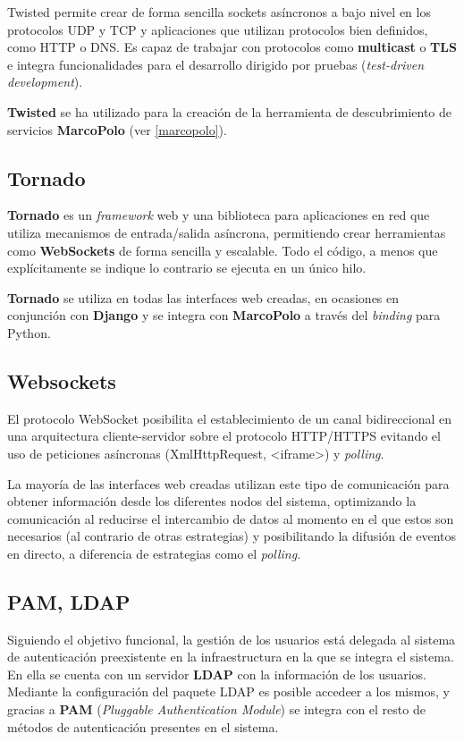 Twisted permite crear de forma sencilla sockets asíncronos a bajo nivel en los protocolos UDP y TCP y aplicaciones que utilizan protocolos bien definidos, como HTTP o DNS. Es capaz de trabajar con protocolos como \textbf{multicast} o \textbf{TLS} e integra funcionalidades para el desarrollo dirigido por pruebas (\textit{test-driven development}).

\textbf{Twisted} se ha utilizado para la creación de la herramienta de descubrimiento de servicios \textbf{MarcoPolo} (ver \ref{marcopolo}).

\subsection{Tornado}

\textbf{Tornado} es un \textit{framework} web y una biblioteca para aplicaciones en red que utiliza mecanismos de entrada/salida asíncrona, permitiendo crear herramientas como \textbf{WebSockets} de forma sencilla y escalable. Todo el código, a menos que explícitamente se indique lo contrario se ejecuta en un único hilo.

\textbf{Tornado} se utiliza en todas las interfaces web creadas, en ocasiones en conjunción con \textbf{Django} y se integra con \textbf{MarcoPolo} a través del \textit{binding} para Python.

\subsection{Websockets}

El protocolo WebSocket \cite{rfc6455} posibilita el establecimiento de un canal bidireccional en una arquitectura cliente-servidor sobre el protocolo HTTP/HTTPS evitando el uso de peticiones asíncronas (XmlHttpRequest, <iframe>) y \textit{polling}.

La mayoría de las interfaces web creadas utilizan este tipo de comunicación para obtener información desde los diferentes nodos del sistema, optimizando la comunicación al reducirse el intercambio de datos al momento en el que estos son necesarios (al contrario de otras estrategias) y posibilitando la difusión de eventos en directo, a diferencia de estrategias como el \textit{polling}.

\subsection{PAM, LDAP}

Siguiendo el objetivo funcional\citationneeded, la gestión de los usuarios está delegada al sistema de autenticación preexistente en la infraestructura en la que se integra el sistema. En ella se cuenta con un servidor \textbf{LDAP} con la información de los usuarios. Mediante la configuración del paquete LDAP es posible accedeer a los mismos, y gracias a \textbf{PAM} (\textit{Pluggable Authentication Module}) se integra con el resto de métodos de autenticación presentes en el sistema.

